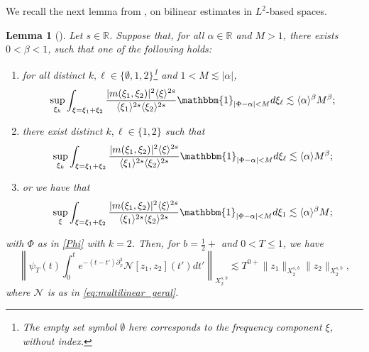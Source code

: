 \documentclass[a4paper,
11pt,  reqno]{amsart}
\newcommand{\jap}[1]{\langle #1 \rangle}
\newcommand{\5}{\textup{V}}
\newcommand{\noi}{\noindent}
\newtheorem{lemma}[theorem]{Lemma}
\theoremstyle{remark}
\newcommand{\R}{\mathbb{R}}
\newcommand{\al}{\alpha}
\renewcommand{\l}{\ell}
\numberwithin{equation}{section}
\numberwithin{theorem}{section}
\newcommand{\Ncal}{\mathcal{N}}
\begin{document}
We recall the next lemma from \cite{CLS}, on bilinear estimates in $L^2$-based spaces. 
		\begin{lemma}[{\cite[Lemma 3.1]{CLS}}]\label{lem:fre_bi}
            Let $s\in\R$. 
			Suppose that, for all $\al\in \R$ and $M>1$, there exists $0<\beta<1$, such that one of the following holds:
			\begin{enumerate}
				\item[(i)] for all distinct $ k, \l\in\{\emptyset,1,2\}$\footnote{The empty set symbol $\emptyset$ here corresponds to the frequency component $\xi$, without index.}
                and $1<M\lesssim |\alpha|$,
				\begin{equation}\label{eq:frequad}
					\sup_{\xi_k}\int_{\xi=\xi_1+\xi_2}
                    \frac{|m(\xi_1,\xi_2)|^2\jap{\xi}^{2s}}{\jap{\xi_{1}}^{2s}\jap{\xi_{2}}^{2s}}\mathbbm{1}_{|\Phi-\alpha|<M} d\xi_{\l} \lesssim \jap{\alpha}^\beta M^\beta;
				\end{equation}

                
				\item[(ii)]
                there exist distinct $k, \l\in\{1,2\}$ such that
				\begin{equation}\label{eq:frequad2}
					\sup_{\xi_k}\int_{\xi=\xi_1+\xi_2}
                    \frac{|m(\xi_1,\xi_2)|^2\jap{\xi}^{2s}}{\jap{\xi_{1}}^{2s}\jap{\xi_{2}}^{2s}}\mathbbm{1}_{|\Phi-\alpha|<M} d\xi_{\l}  \lesssim \jap{\alpha} M^\beta;
				\end{equation}

                
				\item[(iii)] or we have that
				\begin{equation}\label{eq:frequad3}
					\sup_{\xi}\int_{\xi=\xi_1+\xi_2}\frac{|m(\xi_1,\xi_2)|^2\jap{\xi}^{2s}}{\jap{\xi_{1}}^{2s}\jap{\xi_{2}}^{2s}}\mathbbm{1}_{|\Phi-\alpha|<M} d\xi_{1}  \lesssim \jap{\alpha}^\beta M;
				\end{equation}
			\end{enumerate}

            \noi with $\Phi$ as in \eqref{Phi} with $k=2$.
			Then, for $b=\frac12+$ and $0<T \le 1$, we have
			\begin{equation}
				\left\|\psi_T (t)\int_0^te^{-(t-t')\partial_x^3} \Ncal[z_1,z_2](t')dt'\right\|_{X^{s,b}_{2}} \lesssim T^{0+}\|z_1\|_{X^{s,b}_{2}} \|z_2\|_{X^{s,b}_{2}}, 
			\end{equation}
            where $\Ncal$ is as in \eqref{eq:multilinear_geral}.
		\end{lemma}
\end{document}
